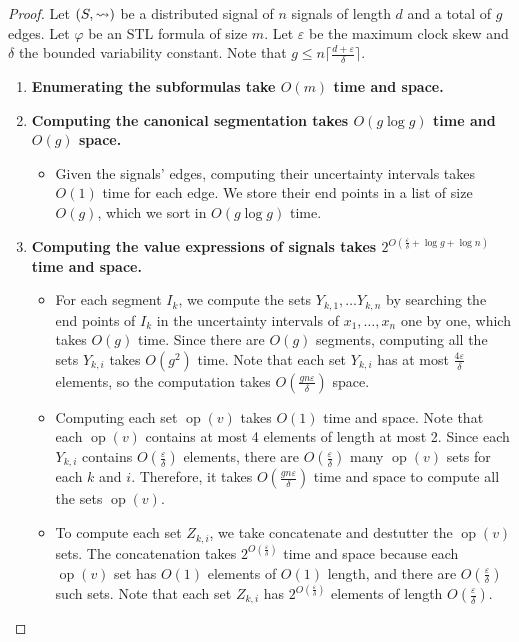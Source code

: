 \begin{proof}
	Let $(S, {\rightsquigarrow})$ be a distributed signal of $n$ signals of length $d$ and a total of $g$ edges.
	Let $\varphi$ be an STL formula of size $m$.
	Let $\varepsilon$ be the maximum clock skew and $\delta$ the bounded variability constant.
	Note that $g \leq n  \lceil \frac{d + \varepsilon}{\delta} \rceil$.
		
	\begin{enumerate}
		\item 
		\textbf{Enumerating the subformulas take $O(m)$ time and space.}
		
		\item 
		\textbf{Computing the canonical segmentation takes $O(g \log g)$ time and $O(g)$ space.}
		\begin{itemize}
			\item 
			Given the signals' edges, computing their uncertainty intervals takes $O(1)$ time for each edge.
			We store their end points in a list of size $O(g)$, which we sort in $O(g \log g)$ time.
		\end{itemize}
		
		
		
		\item	
		\textbf{Computing the value expressions of signals takes $2^{O(\frac{\varepsilon}{\delta} + \log g + \log n)}$ time and space.}
		\begin{itemize}
			\item
			For each segment $I_k$, we compute the sets $Y_{k,1}, \ldots Y_{k,n}$ by searching the end points of $I_k$ in the uncertainty intervals of $x_1, \ldots, x_n$ one by one, which takes $O(g)$ time.
			Since there are $O(g)$ segments, computing all the sets $Y_{k,i}$ takes $O(g^2)$ time.
			Note that each set $Y_{k,i}$ has at most $\frac{4 \varepsilon}{\delta}$ elements, so the computation takes $O(\frac{g n \varepsilon}{\delta})$ space.
			
			\item
			Computing each set $\operatorname{op}(v)$ takes $O(1)$ time and space.
			Note that each $\operatorname{op}(v)$ contains at most 4 elements of length at most 2.
			Since each $Y_{k,i}$ contains $O(\frac{\varepsilon}{\delta})$ elements, there are $O(\frac{\varepsilon}{\delta})$ many $\operatorname{op}(v)$ sets for each $k$ and $i$.
			Therefore, it takes $O(\frac{g n \varepsilon}{\delta})$ time and space to compute all the sets $\operatorname{op}(v)$.
			
			\item
			To compute each set $Z_{k,i}$, we take concatenate and destutter the $\operatorname{op}(v)$ sets.
			The concatenation takes $2^{O(\frac{\varepsilon}{\delta})}$ time and space because each $\operatorname{op}(v)$ set has $O(1)$ elements of $O(1)$ length, and there are $O(\frac{\varepsilon}{\delta})$ such sets.
			Note that each set $Z_{k,i}$ has $2^{O(\frac{\varepsilon}{\delta})}$ elements of length $O(\frac{\varepsilon}{\delta})$.
			

\end{itemize}
\end{enumerate}
\end{proof}
